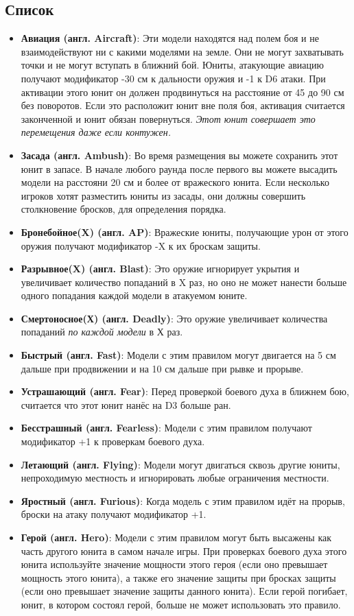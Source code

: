\documentclass[twocolumn]{article}
\newcommand{\h}[1]{\textbf{#1}}
\newcommand{\D}[1][6]{D#1\xspace}
\newcommand{\subsec}[1]{\subsection{#1}\label{subsec:#1}}
\begin{document}
\subsec{Список}
\begin{itemize}
    \item \h{Авиация (англ. Aircraft)}: Эти модели находятся над полем боя и не взаимодействуют ни с какими моделями на земле. Они не могут захватывать точки и не могут вступать в ближний бой. Юниты, атакующие авиацию получают модификатор -30 см к дальности оружия и -1 к \D атаки. При активации этого юнит он должен продвинуться на расстояние от 45 до 90 см без поворотов. Если это расположит юнит вне поля боя, активация считается законченной и юнит обязан повернуться. \emph{Этот юнит совершает это перемещения даже если контужен.}
    \item \h{Засада (англ. Ambush)}: Во время размещения вы можете сохранить этот юнит в запасе. В начале любого раунда после первого вы можете высадить модели на расстояни 20 см и более от вражеского юнита. Если несколько игроков хотят разместить юниты из засады, они должны совершить столкновение бросков, для определения порядка.
    \item \h{Бронебойное(X) (англ. AP)}: Вражеские юниты, получающие урон от этого оружия получают модификатор -X к их броскам защиты.
    \item \h{Разрывное(X) (англ. Blast)}: Это оружие игнорирует укрытия и увеличивает количество попаданий в X раз, но оно не может нанести больше одного попадания каждой модели в атакуемом юните.
    \item \h{Смертоносное(Х) (англ. Deadly)}: Это оружие увеличивает количества попаданий \emph{по каждой модели} в Х раз.
    \item \h{Быстрый (англ. Fast)}: Модели с этим правилом могут двигается на 5 см дальше при продвижении и на 10 см дальше при рывке и прорыве.
    \item \h{Устрашающий (англ. Fear)}: Перед проверкой боевого духа в ближнем бою, считается что этот юнит нанёс на \D[3] больше ран.
    \item \h{Бесстрашный (англ. Fearless)}: Модели с этим правилом получают модификатор +1 к проверкам боевого духа.
    \item \h{Летающий (англ. Flying)}: Модели могут двигаться сквозь другие юниты, непроходимую местность и игнорировать любые ограничения местности.
    \item \h{Яростный (англ. Furious)}: Когда модель с этим правилом идёт на прорыв, броски на атаку получают модификатор +1.
    \item \h{Герой (англ. Hero)}: Модели с этим правилом могут быть высажены как часть другого юнита в самом начале игры. При проверках боевого духа этого юнита используйте значение мощности этого героя (если оно превышает мощность этого юнита), а также его значение защиты при бросках защиты (если оно превышает значение защиты данного юнита). Если герой погибает, юнит, в котором состоял герой, больше не может использовать это правило.

\end{itemize}
\end{document}
